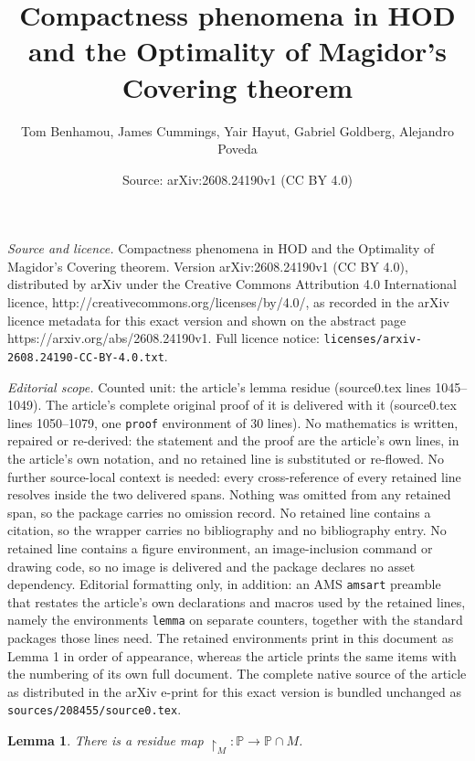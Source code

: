 \documentclass[10pt,a4paper]{amsart}
\title{Compactness phenomena in HOD and the Optimality of Magidor's Covering theorem}
\author{Tom Benhamou, James Cummings, Yair Hayut, Gabriel Goldberg, Alejandro Poveda}
\date{Source: arXiv:2608.24190v1 (CC BY 4.0)}
\newtheorem{lemma}{Lemma}
\newcommand\ale[1]{\marginpar{Alejandro: #1}}
\newcommand\tom[1]{\marginpar{Tom: #1}}
\begin{document}
\maketitle

\noindent\emph{Source and licence.} Compactness phenomena in HOD and the Optimality of Magidor's Covering theorem. Version arXiv:2608.24190v1 (CC BY 4.0), distributed by arXiv under the Creative Commons Attribution 4.0 International licence, http://creativecommons.org/licenses/by/4.0/, as recorded in the arXiv licence metadata for this exact version and shown on the abstract page https://arxiv.org/abs/2608.24190v1. Full licence notice: \texttt{licenses/arxiv-2608.24190-CC-BY-4.0.txt}.\par\smallskip

\noindent\textit{Editorial scope.} Counted unit: the article's lemma residue (source0.tex lines 1045--1049). The article's complete original proof of it is delivered with it (source0.tex lines 1050--1079, one \texttt{proof} environment of 30 lines). No mathematics is written, repaired or re-derived: the statement and the proof are the article's own lines, in the article's own notation, and no retained line is substituted or re-flowed.  No further source-local context is needed: every cross-reference of every retained line resolves inside the two delivered spans.  Nothing was omitted from any retained span, so the package carries no omission record.  No retained line contains a citation, so the wrapper carries no bibliography and no bibliography entry.  No retained line contains a figure environment, an image-inclusion command or drawing code, so no image is delivered and the package declares no asset dependency.  Editorial formatting only, in addition: an AMS \texttt{amsart} preamble that restates the article's own declarations and macros used by the retained lines, namely the environments \texttt{lemma} on separate counters, together with the standard packages those lines need.  The retained environments print in this document as Lemma 1 in order of appearance, whereas the article prints the same items with the numbering of its own full document.  The complete native source of the article as distributed in the arXiv e-print for this exact version is bundled unchanged as \texttt{sources/208455/source0.tex}.
\begin{lemma}\label{lemma: residue}
    There is a  residue map $\restriction_M\colon \mathbb{P}\to \mathbb{P}\cap M$. %
\end{lemma}
\end{document}
